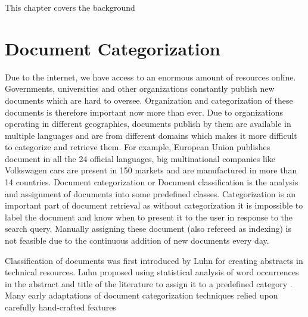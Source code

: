 \label{ch:background}

This chapter covers the background  


\section{Document Categorization}
Due to the internet, we have access to an enormous amount of resources online. Governments, universities and other organizations constantly publish new documents which are hard to oversee. Organization and categorization of these documents is therefore important now more than ever. Due to organizations operating in different geographies, documents publish by them are available in multiple languages and are from different domains which makes it more difficult to categorize and retrieve them. For example, European Union publishes document in all the 24 official languages, big multinational companies like Volkswagen cars are present in 150 markets and are manufactured in more than 14 countries. Document categorization or Document classification is the analysis and assignment of documents into some predefined classes. Categorization is an important part of document retrieval as without categorization it is impossible to label the document and know when to present it to the user in response to the search query. Manually assigning these document (also refereed as indexing) is not feasible due to the continuous addition of new documents every day.

Classification of documents was first introduced by Luhn for creating abstracts in technical resources. Luhn proposed using statistical analysis of word occurrences in the abstract and title of the literature to assign it to a predefined category \cite{luhn1958automatic}. Many early adaptations of document categorization techniques relied upon carefully hand-crafted features \cite{Hayes:1990:CSC:645450.653070, Biebricher:1988:AIS:62437.62470}


